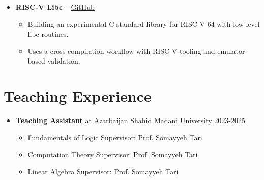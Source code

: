 \documentclass[12pt,a4paper]{article}
\begin{document}
\begin{itemize}[label=\tiny$\bullet$, leftmargin=1em, itemsep=6pt]
    \item \textbf{RISC-V Libc} -- \href{https://github.com/uidops}{GitHub}
    \begin{itemize}
        \item Building an experimental C standard library for RISC-V 64 with low-level libc routines.
        \item Uses a cross-compilation workflow with RISC-V tooling and emulator-based validation.
    \end{itemize}
\end{itemize}

\vspace{3pt}

\section{Teaching Experience}
\begin{itemize}[label=\tiny$\bullet$, leftmargin=1em, itemsep=6pt]
    \item \textbf{Teaching Assistant} at Azarbaijan Shahid Madani University \hfill {\color{textgrey} 2023-2025}
    \begin{itemize}[topsep=0pt]    \item Fundamentals of Logic \hfill Supervisor: \href{https://scholar.google.com/citations?user=dKRgAsIAAAAJ}{\color{primaryblue} Prof. Somayyeh Tari}
        \item Computation Theory \hfill Supervisor: \href{https://scholar.google.com/citations?user=dKRgAsIAAAAJ}{\color{primaryblue} Prof. Somayyeh Tari}
        \item Linear Algebra \hfill Supervisor: \href{https://scholar.google.com/citations?user=dKRgAsIAAAAJ}{\color{primaryblue} Prof. Somayyeh Tari}
    \end{itemize}
\end{itemize}

\vspace{3pt}

\end{document}
